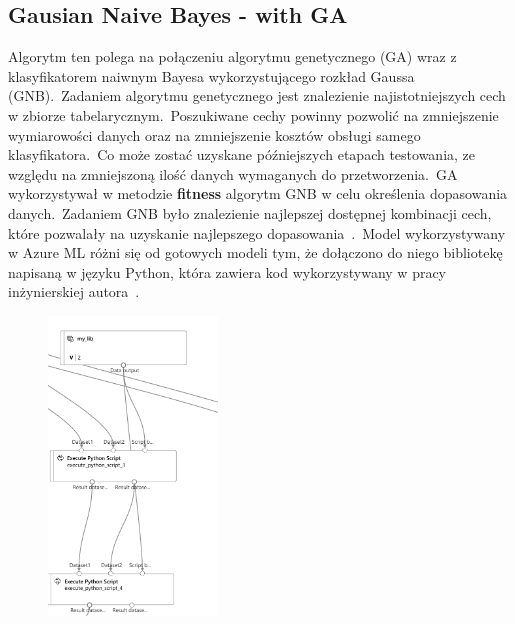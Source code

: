 \subsection{Gausian Naive Bayes - with GA}
Algorytm ten polega na połączeniu algorytmu genetycznego (GA) wraz z klasyfikatorem naiwnym Bayesa wykorzystującego rozkład Gaussa (GNB).\ Zadaniem algorytmu genetycznego jest znalezienie najistotniejszych cech w zbiorze tabelarycznym.\ Poszukiwane cechy powinny pozwolić na zmniejszenie wymiarowości danych oraz na zmniejszenie kosztów obsługi samego klasyfikatora.\ Co może zostać uzyskane późniejszych etapach testowania, ze względu na zmniejszoną ilość danych wymaganych do przetworzenia.\ GA wykorzystywał w metodzie \textbf{fitness} algorytm GNB w celu określenia dopasowania danych.\ Zadaniem GNB było znalezienie najlepszej dostępnej kombinacji cech, które pozwalały na uzyskanie najlepszego dopasowania~\cite{Blyszcz2022}.\ Model wykorzystywany w Azure ML różni się od gotowych modeli tym, że dołączono do niego bibliotekę napisaną w języku Python, która zawiera kod wykorzystywany w pracy inżynierskiej autora~\cite{Suvres2023}.
\begin{figure}[H]
    \centering
    \includegraphics[width=0.4\textwidth]{images/ga_pipe}
    \label{fig:ga-pipe}
\end{figure}

